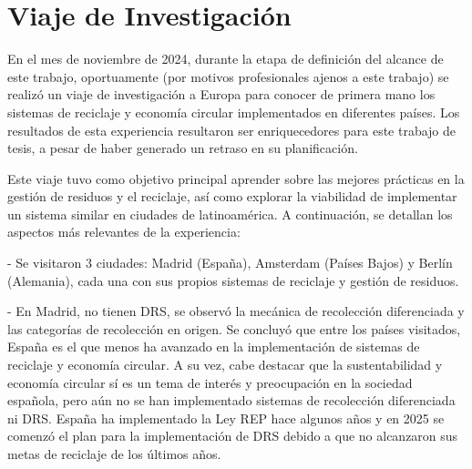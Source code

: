 \chapter{Viaje de Investigación}
\label{cp:europe-trip}

En el mes de noviembre de 2024, durante la etapa de definición del alcance de este trabajo, oportuamente (por motivos profesionales ajenos a este trabajo) se realizó un viaje de investigación a Europa para conocer de primera mano los sistemas de reciclaje y economía circular implementados en diferentes países. Los resultados de esta experiencia resultaron ser enriquecedores para este trabajo de tesis, a pesar de haber generado un retraso en su planificación.

Este viaje tuvo como objetivo principal aprender sobre las mejores prácticas en la gestión de residuos y el reciclaje, así como explorar la viabilidad de implementar un sistema similar en ciudades de latinoamérica. A continuación, se detallan los aspectos más relevantes de la experiencia:

- Se visitaron 3 ciudades: Madrid (España), Amsterdam (Países Bajos) y Berlín (Alemania), cada una con sus propios sistemas de reciclaje y gestión de residuos.

- En Madrid, no tienen DRS, se observó la mecánica de recolección diferenciada y las categorías de recolección en origen. Se concluyó que entre los países visitados, España es el que menos ha avanzado en la implementación de sistemas de reciclaje y economía circular. A su vez, cabe destacar que la sustentabilidad y economía circular sí es un tema de interés y preocupación en la sociedad española, pero aún no se han implementado sistemas de recolección diferenciada ni DRS. España ha implementado la Ley REP hace algunos años y en 2025 se comenzó el plan para la implementación de DRS debido a que no alcanzaron sus metas de reciclaje de los últimos años.

